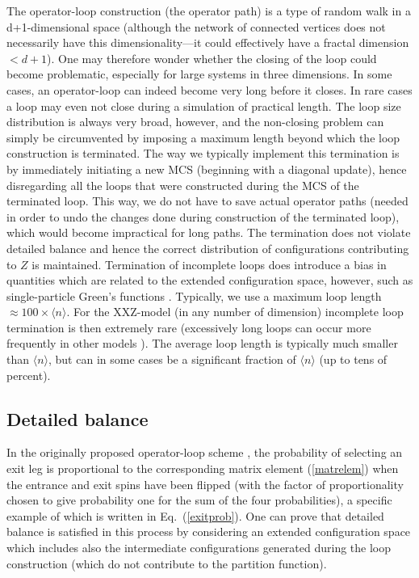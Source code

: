 \documentclass[10pt,pre,aps,twocolumn,showpacs,superscriptaddress,
floatfix]{revtex4}
\begin{document}
The operator-loop construction (the operator path) is a type of random 
walk in a d+1-dimensional space (although the network of connected vertices 
does not necessarily have this dimensionality---it could effectively have a 
fractal dimension $< d+1$). One may therefore wonder whether the closing of 
the loop could become problematic, especially for large systems in three 
dimensions. In some cases, an operator-loop can indeed become very long before
it closes. In rare cases a loop may even not close during a simulation of 
practical length. The loop size distribution is always very broad, however,
and the non-closing problem can simply be circumvented by imposing a maximum 
length beyond which the loop construction is terminated. The way we typically 
implement this termination is by immediately initiating a new MCS (beginning
with a diagonal update), hence disregarding all the loops that were 
constructed during the MCS of the terminated loop. This way, we do not have 
to save actual operator paths (needed in order to undo the 
changes done during construction of the terminated loop), which would become 
impractical for long paths. The termination does not 
violate detailed balance and hence the correct distribution of configurations 
contributing to $Z$ is maintained. Termination of incomplete loops does 
introduce a bias in quantities which are related to the extended configuration
space, however, such as single-particle Green's functions \cite{dorneich2}. 
Typically, we use a maximum loop length $\approx 100\times \langle n\rangle$. 
For the XXZ-model (in any number of dimension) incomplete loop termination 
is then extremely rare (excessively long loops can occur more frequently 
in other models \cite{pinaki}). The average loop length is typically much 
smaller than $\langle n\rangle$, but can in some cases be a significant 
fraction of $\langle n\rangle$ (up to tens of percent).

\subsection{Detailed balance}

In the originally proposed operator-loop scheme \cite{sse3}, the probability
of selecting an exit leg is proportional to the corresponding matrix element 
(\ref{matrelem}) when the entrance and exit spins have been flipped (with 
the factor of proportionality chosen to give probability one for the sum of 
the four probabilities), a specific example of which is written in 
Eq.~(\ref{exitprob}). One can prove that detailed balance is satisfied in 
this process by considering an extended configuration space which includes 
also the intermediate configurations generated during the loop construction 
(which do not contribute to the partition function). 
\end{document}
